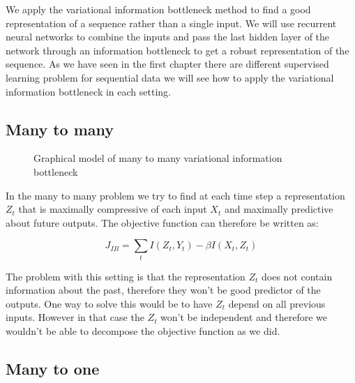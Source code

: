 \documentclass[11pt,oneside,openright]{report}
\begin{document}
We apply the variational information bottleneck method to find a good representation of a sequence rather than a single input. We will use recurrent neural networks to combine the inputs and pass the last hidden layer of the network through an information bottleneck to get a robust representation of the sequence. As we have seen in the first chapter there are different supervised learning problem for sequential data we will see how to apply the variational information bottleneck in each setting.

\subsection{Many to many}
\begin{figure}[H]
\centering
{}
\caption{Graphical model of many to many variational information bottleneck}
\end{figure}

In the many to many problem we try to find at each time step a representation $Z_t$ that is maximally compressive of each input $X_t$ and maximally predictive about future outputs. The objective function can therefore be written as:

$$ J_{IB} = \sum_t I(Z_t, Y_{t}) - \beta I(X_{t}, Z_t)$$
 
 The problem with this setting is that the representation $Z_t$ does not contain information about the past, therefore they won't be good predictor of the outputs. One way to solve this would be to have $Z_t$ depend on all previous inputs. However in that case the $Z_t$ won't be independent and therefore we wouldn't be able to decompose the objective function as we did.
 
\subsection{Many to one}
\end{document}
